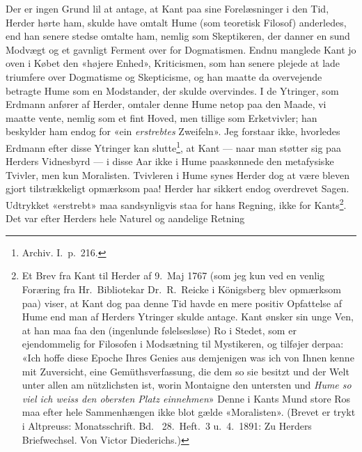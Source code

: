 \documentclass[12pt,a4paper]{article}
\newcommand{\apage}[1]{\marginnote{\footnotesize\textit{[#1]}}}
\begin{document}
Der er ingen Grund lil at antage, at Kant paa sine Forelæsninger i den
Tid, Herder hørte ham, skulde have omtalt Hume (som teoretisk Filosof)
anderledes, end han senere stedse omtalte ham, nemlig som Skeptikeren,
der danner en sund Modvægt og et gavnligt Ferment over for Dogmatismen.
Endnu manglede Kant jo oven i Købet den «højere Enhed», Kriticismen, som
han senere plejede at lade triumfere over Dogmatisme og Skepticisme, og
han maatte da overvejende betragte Hume som en Modstander, der skulde
overvindes. I de Ytringer, som Erdmann anfører af Herder, omtaler denne
Hume netop paa den Maade, vi maatte vente, nemlig som et fint Hoved, men
tillige som Erketvivler; han beskylder ham endog for «ein \emph{erstrebtes}
Zweifeln». Jeg forstaar ikke, hvorledes Erdmann efter disse Ytringer kan
slutte\footnote{Archiv. I.\ p.\ 216.}, at Kant --- naar man
støtter sig paa \apage{25} Herders Vidnesbyrd --- i disse Aar ikke i Hume
paaskønnede den metafysiske Tvivler, men kun Moralisten. Tvivleren i Hume
synes Herder dog at være bleven gjort tilstrækkeligt opmærksom paa!
Herder har sikkert endog overdrevet Sagen. Udtrykket «erstrebt» maa
sandsynligvis staa for hans Regning, ikke for
Kants\footnote{Et Brev fra Kant til Herder af 9.\ Maj 1767 (som jeg kun
ved en venlig Foræring fra Hr.\ Bibliotekar Dr.\ R.\ Reicke i Königsberg
blev opmærksom paa) viser, at Kant dog paa denne Tid havde en mere positiv
Opfattelse af Hume end man af Herders Ytringer skulde antage. Kant ønsker
sin unge Ven, at han maa faa den (ingenlunde følelsesløse) Ro i Stedet,
som er ejendommelig for Filosofen i Modsætning til Mystikeren, og tilføjer
derpaa: «Ich hoffe diese Epoche Ihres Genies aus demjenigen was ich von
Ihnen kenne mit Zuversicht, eine Gemüthsverfassung, die dem so sie
besitzt und der Welt unter allen am nützlichsten ist, worin Montaigne den
untersten und \emph{Hume so viel ich weiss den obersten Platz einnehmen}» Denne
i Kants Mund store Ros maa efter hele Sammenhængen ikke blot gælde
«Moralisten». (Brevet er trykt i Altpreuss: Monatsschrift. Bd.\
28.\ Heft.\ 3 u.\ 4.\ 1891: Zu Herders Briefwechsel. Von Victor
Diederichs.)}. Det var efter Herders hele Naturel og aandelige Retning
\end{document}
